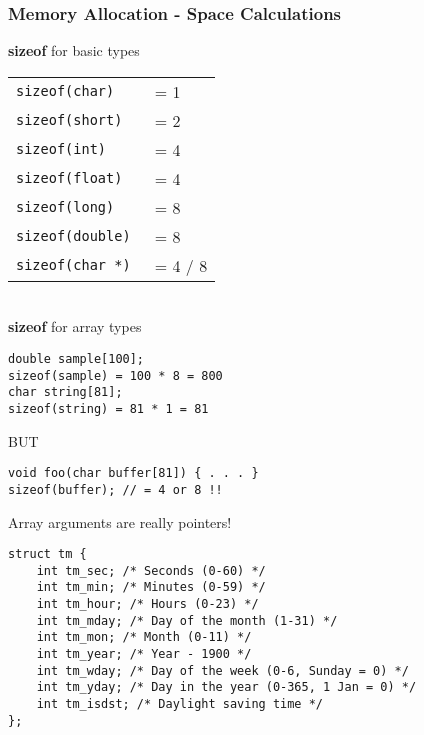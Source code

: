 \documentclass[10pt]{article}
\begin{document}
\begin{multicols}{2}
\begin{minipage}{\columnwidth}
        \subsubsection*{Memory Allocation - Space Calculations}
        \textbf{sizeof} for basic types \\
        \begin{tabular}{ll}
            \hline
            \lstinline|sizeof(char)|    & = 1     \\
            \lstinline|sizeof(short)|   & = 2     \\
            \lstinline|sizeof(int)|     & = 4     \\
            \lstinline|sizeof(float)|   & = 4     \\
            \lstinline|sizeof(long)|    & = 8     \\
            \lstinline|sizeof(double)|  & = 8     \\
            \lstinline|sizeof(char *) | & = 4 / 8 \\
            \hline
        \end{tabular}
        \\
        \textbf{sizeof} for array types
        \begin{lstlisting}
double sample[100];
sizeof(sample) = 100 * 8 = 800
char string[81];
sizeof(string) = 81 * 1 = 81
        \end{lstlisting}
        BUT
        \begin{lstlisting}
void foo(char buffer[81]) { . . . }
sizeof(buffer); // = 4 or 8 !!
\end{lstlisting}
        Array arguments are really pointers!
        \tiny
        \begin{lstlisting}
struct tm {
    int tm_sec; /* Seconds (0-60) */
    int tm_min; /* Minutes (0-59) */
    int tm_hour; /* Hours (0-23) */
    int tm_mday; /* Day of the month (1-31) */
    int tm_mon; /* Month (0-11) */
    int tm_year; /* Year - 1900 */
    int tm_wday; /* Day of the week (0-6, Sunday = 0) */
    int tm_yday; /* Day in the year (0-365, 1 Jan = 0) */
    int tm_isdst; /* Daylight saving time */
};
\end{lstlisting}
    \end{minipage}
    \begin{minipage}{1.5\columnwidth}
        \begin{multicols*}{2}
            \hspace*{-9.5em}
            \begin{minipage}{0.8\columnwidth}
                \vspace*{-15em}

\end{minipage}
\end{multicols*}
\end{minipage}
\end{multicols}
\end{document}
